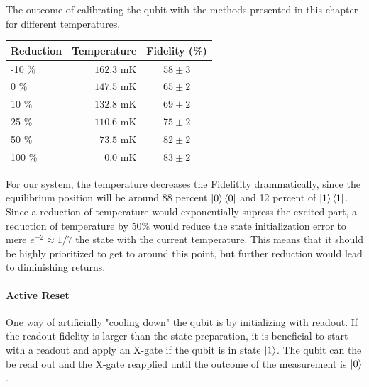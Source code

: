 \begin{margintable}
\centering
\caption{The outcome of calibrating the qubit with the methods presented in this chapter for different temperatures.}
\vspace{0.3 cm}
\begin{tabular}{lr|c}
\hline
\textbf{Reduction}        & Temperature                  & Fidelity (\%)\\ \hline
-10 \%                    &  $162.3 $ mK       &  $58 \pm 3$\\
0   \%                    &  $147.5 $ mK       &  $65 \pm 2$\\
10  \%                    &  $132.8 $ mK       &  $69 \pm 2$\\
25  \%                    &  $110.6 $ mK       &  $75 \pm 2$\\
50  \%                    &  $\; 73.5$  mK     &  $82 \pm 2$\\
100 \%                    &  $\;\; 0.0$  mK    &  $83 \pm 2$\\
\end{tabular}
\label{tab:temperature_contribution_estimation}
\end{margintable}
For our system, the temperature decreases the Fidelitity drammatically, since the equilibrium position will be around 88 percent $\ket{0}\bra{0}$ and 12 percent of $\ket{1}\bra{1}$. Since a reduction of temperature would exponentially supress the excited part, a reduction of temperature by 50\% would reduce the state initialization error to mere $e^{-2}\approx 1/7$ the state with the current temperature. This means that it should be highly prioritized to get to around this point, but further reduction  would lead to diminishing returns.

\paragraph{Active Reset} One way of artificially "cooling down" the qubit is by initializing with readout. If the readout fidelity is larger than the state preparation, it is beneficial to start with a readout and apply an X-gate if the qubit is in state $\ket{1}$. The qubit can the be read out and the X-gate reapplied until the outcome of the measurement is $\ket{0}$.

